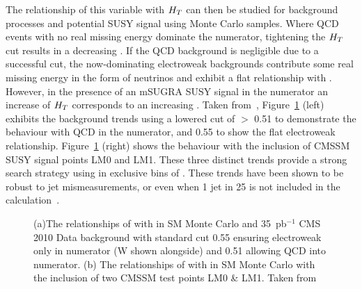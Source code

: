 The relationship of this variable with $H_{T}$ can then be studied for background processes and potential SUSY signal using Monte Carlo samples. Where QCD events with no real missing energy dominate the numerator, tightening the $H_{T}$ cut results in a decreasing \RaT. If the QCD background is negligible due to a successful \alt cut, the now-dominating  electroweak backgrounds contribute some real missing energy in the form of neutrinos and exhibit a flat relationship with \HT. However, in the presence of an mSUGRA SUSY signal in the numerator an increase of $H_{T}$ corresponds to an increasing \RaT. Taken from~\cite{35paper}, Figure~\ref{fig:ratfigs} (left) exhibits the background trends using a lowered cut of \alt $>$ 0.51 to demonstrate the behaviour with QCD in the numerator, and 0.55 to show the flat electroweak relationship. Figure~\ref{fig:ratfigs} (right) shows the behaviour with the inclusion of CMSSM SUSY signal points LM0 and LM1. These three distinct trends provide a strong search strategy using \RaT in exclusive bins of \HT. These trends have been shown to be robust to jet mismeasurements, or even when 1 jet in 25 is not included in the calculation~\cite{an2010_119}.


\begin{figure}[htbp]
\begin{center}

\caption[(a)The relationships of \RaT with \HT in SM Monte Carlo and 35~pb$^{-1}$ CMS 2010 Data  background with standard \alt cut 0.55 ensuring electroweak only in numerator (W shown alongside) and 0.51 allowing QCD into numerator. (b) The relationships of \RaT with \HT in SM Monte Carlo with the inclusion of two CMSSM test points LM0 \& LM1.]{\label{fig:ratfigs}(a)The relationships of \RaT with \HT in SM Monte Carlo and 35~pb$^{-1}$ CMS 2010 Data  background with standard \alt cut 0.55 ensuring electroweak only in numerator (W shown alongside) and 0.51 allowing QCD into numerator. (b) The relationships of \RaT with \HT in SM Monte Carlo with the inclusion of two CMSSM test points LM0 \& LM1. Taken from~\cite{35paper}}
\end{center}
\end{figure}



